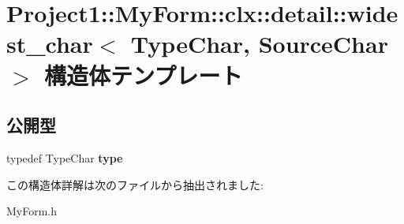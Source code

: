 \hypertarget{struct_project1_1_1_my_form_1_1clx_1_1detail_1_1widest__char}{}\section{Project1\+:\+:My\+Form\+:\+:clx\+:\+:detail\+:\+:widest\+\_\+char$<$ Type\+Char, Source\+Char $>$ 構造体テンプレート}
\label{struct_project1_1_1_my_form_1_1clx_1_1detail_1_1widest__char}
\subsection*{公開型}
\begin{DoxyCompactItemize}
\item 
\mbox{\label{struct_project1_1_1_my_form_1_1clx_1_1detail_1_1widest__char_a4aa71a0d7a47cc56ba9b8520126f8b21}} 
typedef Type\+Char {\bfseries type}
\end{DoxyCompactItemize}


この構造体詳解は次のファイルから抽出されました\+:\begin{DoxyCompactItemize}
\item 
My\+Form.\+h\end{DoxyCompactItemize}
